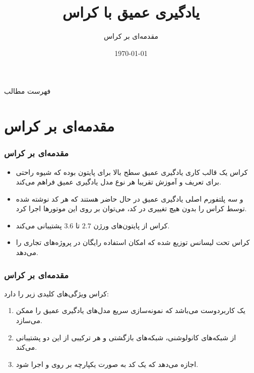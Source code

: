 \documentclass[10pt,xcolor=dvipsnames,professionalfont]{beamer}
\title{یادگیری عمیق با کراس}
\subtitle{مقدمه‌ای بر کراس}
\author[علیرضا بیکی]{\co{علیرضا بیکی}}
\institute{دانشگاه شیراز}
\date{\today}
\begin{document}
\begin{frame}
\maketitle
\end{frame}

\begin{frame}{فهرست مطالب}
\tableofcontents
\end{frame}


\section{مقدمه‌ای بر کراس}

\begin{frame}
\frametitle{مقدمه‌ای بر کراس}
\begin{itemize}
\item
کراس یک قالب کاری یادگیری عمیق سطح بالا برای پایتون بوده که شیوه راحتی برای تعریف و آموزش تقریبا هر نوع مدل یادگیری عمیق فراهم می‌کند.
\vspace{0.5cm}
\item
{} و  
سه پلتفورم اصلی یادگیری عمیق در حال حاضر هستند که هر کد نوشته شده توسط کراس را بدون هیچ تغییری در کد، می‌توان بر روی این موتورها اجرا کرد.
\item
\vspace{0.5cm}
کراس از پایتون‌های ورژن $2.7$ تا $3.6$ پشتیبانی می‌کند.
\vspace{0.5cm}
\item
کراس تحت لیسانس  توزیع شده که امکان استفاده رایگان در پروژه‌های تجاری را می‌دهد.
\end{itemize}
\end{frame}

\begin{frame}
\frametitle{مقدمه‌ای بر کراس}
کراس ویژگی‌های کلیدی زیر را دارد:
\vspace{0.5cm}
\begin{enumerate}
\item
یک  کاربردوست می‌باشد که نمونه‌سازی سریع مدل‌های یادگیری عمیق را ممکن می‌سازد.
\vspace{0.2cm}
\item
از شبکه‌های کانولوشنی، شبکه‌های بازگشتی و هر ترکیبی از این دو پشتیبانی می‌کند.
\vspace{0.2cm}
\item
اجازه می‌دهد که یک کد به صورت یکپارچه بر روی  و  اجرا شود.
\end{enumerate}
\end{frame}
\end{document}
